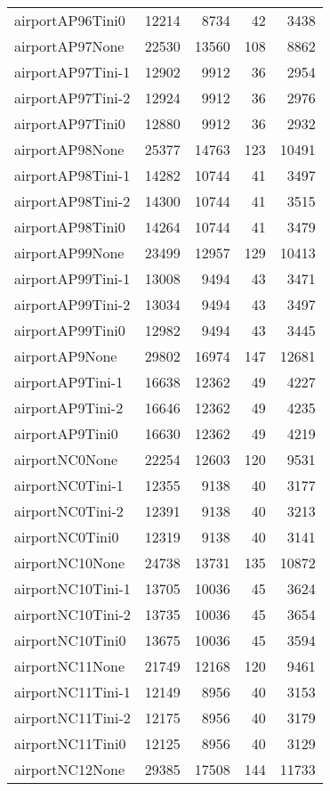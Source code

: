 \begin{longtable}{lrrrr}
airportAP96Tini0 & 12214 & 8734 & 42 & 3438 \\
airportAP97None & 22530 & 13560 & 108 & 8862 \\
airportAP97Tini-1 & 12902 & 9912 & 36 & 2954 \\
airportAP97Tini-2 & 12924 & 9912 & 36 & 2976 \\
airportAP97Tini0 & 12880 & 9912 & 36 & 2932 \\
airportAP98None & 25377 & 14763 & 123 & 10491 \\
airportAP98Tini-1 & 14282 & 10744 & 41 & 3497 \\
airportAP98Tini-2 & 14300 & 10744 & 41 & 3515 \\
airportAP98Tini0 & 14264 & 10744 & 41 & 3479 \\
airportAP99None & 23499 & 12957 & 129 & 10413 \\
airportAP99Tini-1 & 13008 & 9494 & 43 & 3471 \\
airportAP99Tini-2 & 13034 & 9494 & 43 & 3497 \\
airportAP99Tini0 & 12982 & 9494 & 43 & 3445 \\
airportAP9None & 29802 & 16974 & 147 & 12681 \\
airportAP9Tini-1 & 16638 & 12362 & 49 & 4227 \\
airportAP9Tini-2 & 16646 & 12362 & 49 & 4235 \\
airportAP9Tini0 & 16630 & 12362 & 49 & 4219 \\
airportNC0None & 22254 & 12603 & 120 & 9531 \\
airportNC0Tini-1 & 12355 & 9138 & 40 & 3177 \\
airportNC0Tini-2 & 12391 & 9138 & 40 & 3213 \\
airportNC0Tini0 & 12319 & 9138 & 40 & 3141 \\
airportNC10None & 24738 & 13731 & 135 & 10872 \\
airportNC10Tini-1 & 13705 & 10036 & 45 & 3624 \\
airportNC10Tini-2 & 13735 & 10036 & 45 & 3654 \\
airportNC10Tini0 & 13675 & 10036 & 45 & 3594 \\
airportNC11None & 21749 & 12168 & 120 & 9461 \\
airportNC11Tini-1 & 12149 & 8956 & 40 & 3153 \\
airportNC11Tini-2 & 12175 & 8956 & 40 & 3179 \\
airportNC11Tini0 & 12125 & 8956 & 40 & 3129 \\
airportNC12None & 29385 & 17508 & 144 & 11733 \\

\end{longtable}

